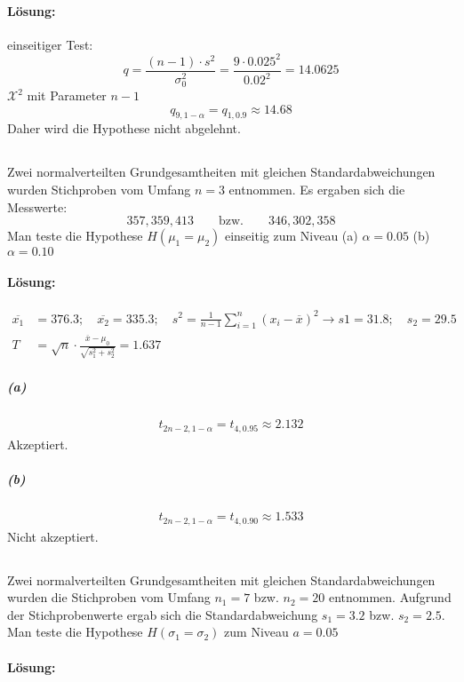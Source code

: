 \documentclass[ngerman]{scrartcl}
\begin{document}
\paragraph{Lösung:}
einseitiger Test:
\begin{equation*}
q = \frac{(n-1)\cdot s^2}{\sigma_0^2} = \frac{9 \cdot 0.025^2}{0.02^2} = 14.0625
\end{equation*}
$\mathcal{X}^2$ mit Parameter $n-1$\[
q_{9,1-\alpha} = q_{1,0.9}\approx 14.68\]
Daher wird die Hypothese nicht abgelehnt.

\subsection{}
Zwei normalverteilten Grundgesamtheiten mit gleichen Standardabweichungen wurden Stichproben vom Umfang $n=3$ entnommen. Es ergaben sich die Messwerte:\[
357,359,413\qquad \text{bzw.}\qquad 346,302,358
\]
Man teste die Hypothese $H(\mu_1 = \mu_2)$ einseitig zum Niveau (a) $\alpha =0.05$ (b) $\alpha= 0.10$
\paragraph{Lösung:}
\begin{align*}
\overline{x_1} &= 376.3;\quad \overline{x_2} = 335.3;\quad s^2=\frac{1}{n-1}\sum_{i=1}^{n}\left(x_i - \overline{x}\right)^2\rightarrow s1 = 31.8;\quad s_2 = 29.5\\
 T &= \sqrt{n}\cdot \frac{\overline{x} - \mu_0}{\sqrt{s_1^2 + s_2^2}} = 1.637
\end{align*}
\subparagraph{(a)}
\begin{align*}
t_{2n-2, 1-\alpha} = t_{4, 0.95}\approx 2.132
\end{align*}
Akzeptiert.
\subparagraph{(b)}
\begin{align*}
t_{2n-2, 1-\alpha} = t_{4, 0.90}\approx 1.533
\end{align*}
Nicht akzeptiert.
\subsection{}
Zwei normalverteilten Grundgesamtheiten mit gleichen Standardabweichungen wurden die Stichproben vom Umfang $n_1 = 7$ bzw. $n_2 = 20$ entnommen. Aufgrund der Stichprobenwerte ergab sich die Standardabweichung $s_1 = 3.2$ bzw. $s_2 = 2.5$. Man teste die Hypothese $H(\sigma_1 = \sigma_2)$ zum Niveau $a = 0.05$
\paragraph{Lösung:}
\end{document}
